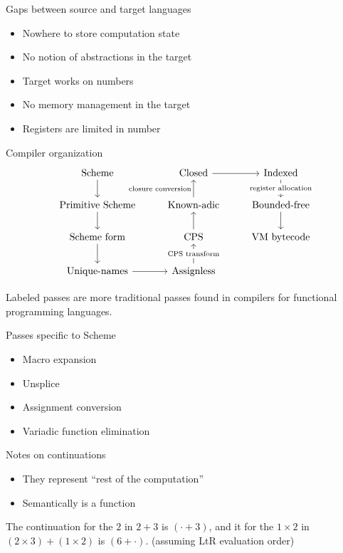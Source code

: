 \documentclass{beamer}
\begin{document}
\begin{frame}{Gaps between source and target languages}
  \begin{itemize}
  \item Nowhere to store computation state
  \item No notion of abstractions in the target
  \item Target works on numbers
  \item No memory management in the target
  \item Registers are limited in number
  \end{itemize}
\end{frame}

\begin{frame}[fragile]{Compiler organization}
  \[\begin{tikzcd}
\text{Scheme} \arrow[d]           & \text{Closed} \arrow[r]      & \text{Indexed} \arrow[d, "\text{register allocation}" description]      \\
\text{Primitive Scheme} \arrow[d] & \text{Known-adic} \arrow[u, "\text{closure conversion}"]  & \text{Bounded-free} \arrow[d] \\
\text{Scheme form} \arrow[d]      & \text{CPS} \arrow[u]         & \text{VM bytecode}            \\
\text{Unique-names} \arrow[r]     & \text{Assignless} \arrow[u, "\text{CPS transform}" description] &                              
\end{tikzcd}\]

Labeled passes are more traditional passes found in compilers for functional programming languages.
\end{frame}

\begin{frame}{Passes specific to Scheme}
  \begin{itemize}
  \item Macro expansion
  \item Unsplice
  \item Assignment conversion
  \item Variadic function elimination
  \end{itemize}
\end{frame}

\begin{frame}{Notes on continuations}
  \begin{itemize}
  \item They represent ``rest of the computation''
  \item Semantically is a function
  \end{itemize}

  \begin{example}
    The continuation for the $2$ in $2+3$ is $(\cdot+3)$, and it for the $1\times2$ in $(2\times3)+(1\times2)$ is $(6+\cdot)$. (assuming LtR evaluation order)
  \end{example}
\end{frame}
\end{document}
